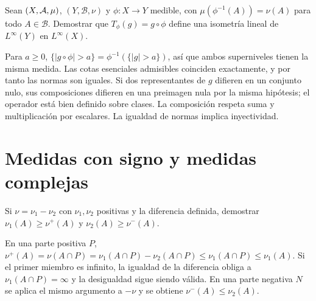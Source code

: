 \begin{ejercicio}\label{ej:v2-l23-7}
Sean $(X,\mathcal A,\mu)$, $(Y,\mathcal B,\nu)$ y $\phi:X\to Y$ medible, con $\mu(\phi^{-1}(A))=\nu(A)$ para todo $A\in\mathcal B$. Demostrar que $T_\phi(g)=g\circ\phi$ define una isometría lineal de $L^\infty(Y)$ en $L^\infty(X)$.
\end{ejercicio}
\begin{solucion}
Para $a\ge0$, $\{|g\circ\phi|>a\}=\phi^{-1}(\{|g|>a\})$, así que ambos superniveles tienen la misma medida. Las cotas esenciales admisibles coinciden exactamente, y por tanto las normas son iguales. Si dos representantes de $g$ difieren en un conjunto nulo, sus composiciones difieren en una preimagen nula por la misma hipótesis; el operador está bien definido sobre clases. La composición respeta suma y multiplicación por escalares. La igualdad de normas implica inyectividad.
\end{solucion}

\chapter{Medidas con signo y medidas complejas}

\begin{ejercicio}\label{ej:v2-l25-1}
Si $\nu=\nu_1-\nu_2$ con $\nu_1,\nu_2$ positivas y la diferencia definida, demostrar $\nu_1(A)\ge\nu^+(A)$ y $\nu_2(A)\ge\nu^-(A)$.
\end{ejercicio}
\begin{solucion}
En una parte positiva $P$, $\nu^+(A)=\nu(A\cap P)=\nu_1(A\cap P)-\nu_2(A\cap P)\le\nu_1(A\cap P)\le\nu_1(A)$. Si el primer miembro es infinito, la igualdad de la diferencia obliga a $\nu_1(A\cap P)=\infty$ y la desigualdad sigue siendo válida. En una parte negativa $N$ se aplica el mismo argumento a $-\nu$ y se obtiene $\nu^-(A)\le\nu_2(A)$.
\end{solucion}

